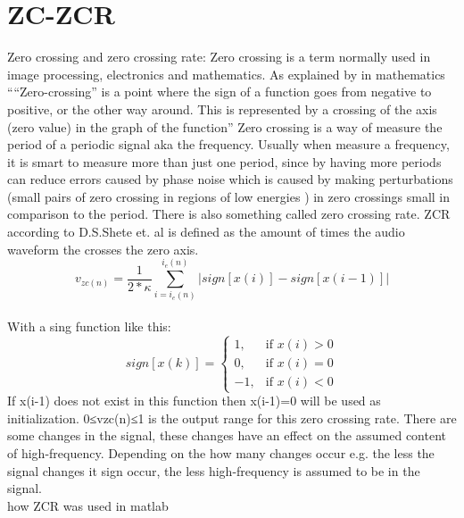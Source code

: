 \section{ZC-ZCR}

Zero crossing and zero crossing rate:
Zero crossing is a term normally used in image processing, electronics and mathematics. As explained by \cite{Al-Zhrani2010} in mathematics ““Zero-crossing” is a point where the sign of a function goes from negative to positive, or the other way around. This is represented by a crossing of the axis (zero value) in the graph of the function” \cite{Al-Zhrani2010}
Zero crossing is a way of measure the period of a periodic signal aka the frequency.\cite{RWW2012}  Usually when measure a frequency, it is smart to measure more than just one period, since by having more periods can reduce errors caused by phase noise which is caused by making perturbations (small pairs of zero crossing in regions of low energies \cite{Mallat1988} ) in zero crossings small in comparison to the period. \cite{RWW2012}
There is also something called zero crossing rate. ZCR according to D.S.Shete et. al is defined as the amount of times the audio waveform the crosses the zero axis.\\
\begin{equation}\label{eq:ZCR}
v_{zc(n)}= \frac{1}{2* \kappa}\sum_{i=i_e(n)}^{i_e (n)}|sign[x(i)]-sign[x(i-1)]|
\end{equation}
\\
With a sing function like this:
\begin{equation}
sign[x(k)]=
\begin{cases}
 1, & \text{if } x(i)>0\\ 
 0, & \text{if } x(i)=0\\
-1, & \text{if } x(i)<0
\end{cases}
\end{equation}
If x(i-1) does not exist in this function then x(i-1)=0 will be used as initialization. 
0≤vzc(n)≤1 is the output range for this zero crossing rate. There are some changes in the signal, these changes have an effect on the assumed content of high-frequency. Depending on the how many changes occur e.g. the less the signal changes it sign occur, the less high-frequency is assumed to be in the signal. \cite{Al-Zhrani2010} 
\\
how ZCR was used in matlab
\\
